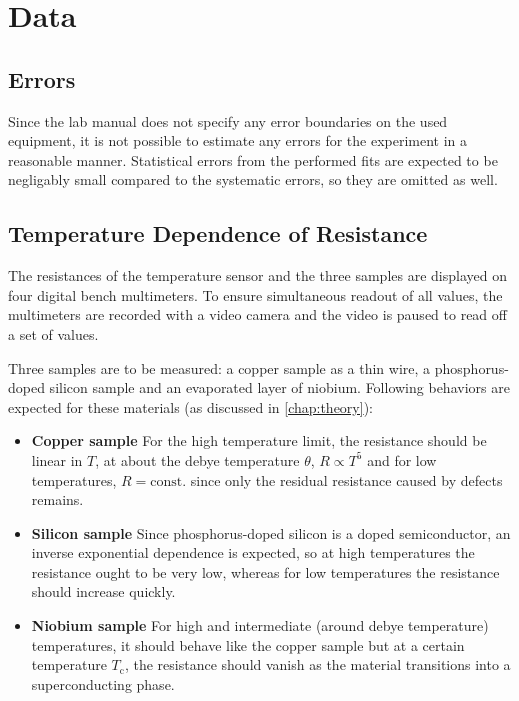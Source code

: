 \chapter{Data}

\section{Errors}
Since the lab manual does not specify any error boundaries on the used equipment, it is not possible to estimate any errors for the experiment in a reasonable manner.
Statistical errors from the performed fits are expected to be negligably small compared to the systematic errors, so they are omitted as well.

\section{Temperature Dependence of Resistance}
The resistances of the temperature sensor and the three samples are displayed on four digital bench multimeters.
To ensure simultaneous readout of all values, the multimeters are recorded with a video camera and the video is paused to read off a set of values.

Three samples are to be measured: a copper sample as a thin wire, a phosphorus-doped silicon sample and an evaporated layer of niobium.
Following behaviors are expected for these materials (as discussed in \autoref{chap:theory}):
\begin{itemize}
	\item \textbf{Copper sample} For the high temperature limit, the resistance should be linear in $T$, at about the debye temperature $\theta$, $R\propto T^5$ and for low temperatures, $R=\text{const.}$ since only the residual resistance caused by defects remains.
	\item \textbf{Silicon sample} Since phosphorus-doped silicon is a doped semiconductor, an inverse exponential dependence is expected, so at high temperatures the resistance ought to be very low, whereas for low temperatures the resistance should increase quickly.
	\item \textbf{Niobium sample} For high and intermediate (around debye temperature) temperatures, it should behave like the copper sample but at a certain temperature $T_\text{c}$, the resistance should vanish as the material transitions into a superconducting phase.
\end{itemize}


